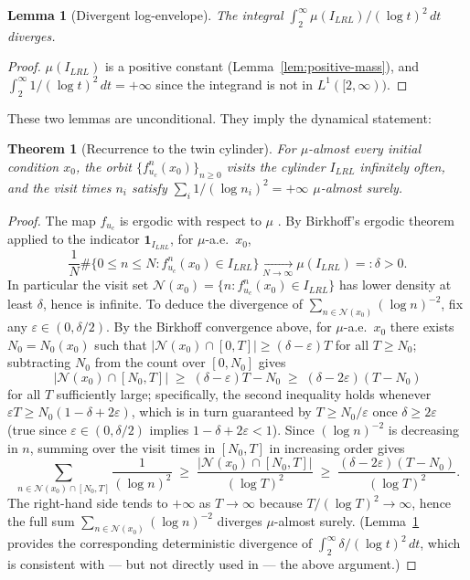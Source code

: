 \documentclass{iopjournal}
\newtheorem{theorem}{Theorem}
\newtheorem{lemma}{Lemma}
\theoremstyle{definition}
\begin{document}
\begin{lemma}[Divergent log-envelope]
\label{lem:divergent-envelope}
The integral $\int_2^\infty \mu(I_{LRL}) / (\log t)^2 \, dt$ diverges.
\end{lemma}
\begin{proof}
$\mu(I_{LRL})$ is a positive constant (Lemma~\ref{lem:positive-mass}),
and $\int_2^\infty 1/(\log t)^2 \, dt = +\infty$ since the integrand is
not in $L^1([2, \infty))$.
\end{proof}

These two lemmas are unconditional. They imply the dynamical statement:

\begin{theorem}[Recurrence to the twin cylinder]
\label{thm:dynamical-recurrence}
For $\mu$-almost every initial condition $x_0$, the orbit
$\{f_{u_c}^n(x_0)\}_{n \geq 0}$ visits the cylinder $I_{LRL}$ infinitely
often, and the visit times $n_i$ satisfy $\sum_i 1/(\log n_i)^2 = +\infty$
$\mu$-almost surely.
\end{theorem}
\begin{proof}
The map $f_{u_c}$ is ergodic with respect to $\mu$
\cite{misiurewicz1981absolutely}. By Birkhoff's ergodic theorem applied
to the indicator $\mathbf{1}_{I_{LRL}}$, for $\mu$-a.e.\ $x_0$,
\[
    \frac{1}{N} \#\{ 0 \leq n \leq N : f_{u_c}^n(x_0) \in I_{LRL} \}
    \xrightarrow[N \to \infty]{} \mu(I_{LRL}) =: \delta > 0.
\]
In particular the visit set
$\mathcal{N}(x_0) = \{ n : f_{u_c}^n(x_0) \in I_{LRL}\}$ has lower
density at least $\delta$, hence is infinite. To deduce the divergence
of $\sum_{n \in \mathcal{N}(x_0)} (\log n)^{-2}$, fix any
$\varepsilon \in (0, \delta/2)$. By the Birkhoff convergence above,
for $\mu$-a.e.\ $x_0$ there exists $N_0 = N_0(x_0)$ such that
$|\mathcal{N}(x_0) \cap [0, T]| \geq (\delta - \varepsilon) T$ for all
$T \geq N_0$; subtracting $N_0$ from the count over $[0, N_0]$ gives
\[
    |\mathcal{N}(x_0) \cap [N_0, T]|
    \;\geq\; (\delta - \varepsilon) T - N_0
    \;\geq\; (\delta - 2\varepsilon)(T - N_0)
\]
for all $T$ sufficiently large; specifically, the second inequality
holds whenever $\varepsilon T \geq N_0 (1 - \delta + 2\varepsilon)$,
which is in turn guaranteed by $T \geq N_0 / \varepsilon$ once
$\delta \geq 2\varepsilon$ (true since
$\varepsilon \in (0, \delta/2)$ implies $1 - \delta + 2\varepsilon < 1$).
Since $(\log n)^{-2}$ is decreasing in $n$, summing over the visit
times in $[N_0, T]$ in increasing order gives
\[
    \sum_{n \in \mathcal{N}(x_0) \cap [N_0, T]} \frac{1}{(\log n)^2}
    \;\geq\; \frac{|\mathcal{N}(x_0) \cap [N_0, T]|}{(\log T)^2}
    \;\geq\; \frac{(\delta - 2\varepsilon)(T - N_0)}{(\log T)^2}.
\]
The right-hand side tends to $+\infty$ as $T \to \infty$ because
$T / (\log T)^2 \to \infty$, hence the full sum
$\sum_{n \in \mathcal{N}(x_0)} (\log n)^{-2}$ diverges $\mu$-almost
surely. (Lemma~\ref{lem:divergent-envelope} provides the corresponding
deterministic divergence of $\int_2^\infty \delta / (\log t)^2 \, dt$,
which is consistent with --- but not directly used in --- the above
argument.)
\end{proof}
\end{document}
